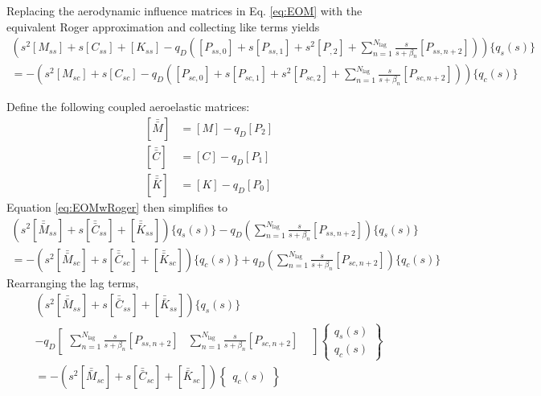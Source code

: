 Replacing the aerodynamic influence matrices in Eq. \ref{eq:EOM} with the equivalent Roger approximation and collecting like terms yields
\begin{multline}
	\label{eq:EOMwRoger}
	\left( s^2 [M_{ss}] + s [C_{ss}] + [K_{ss}]
	- q_D \left( [P_{ss,0}] + s[P_{ss,1}] + s^2 [P_{,2}] + \sum_{n=1}^{N_\text{lag}} \frac{s}{s+\beta_n} [P_{ss,n+2}] \right) \right) \{ q_s(s)\} \\
	=
	- \left( s^2 [M_{sc}] + s [C_{sc}] - q_D \left( [P_{sc,0}] + s [P_{sc,1}] + s^2 [P_{sc,2}] + \sum_{n=1}^{N_\text{lag}} \frac{s}{s+\beta_n} [P_{sc,n+2}] \right) \right) \{q_c(s)\}
\end{multline}

Define the following coupled aeroelastic matrices:
\begin{equation}
\begin{aligned}
	\left[\bar{\bar{M}}\right] &= [M] - q_D [P_2] \\
	\left[\bar{\bar{C}}\right] &= [C] - q_D [P_1] \\
	\left[\bar{\bar{K}}\right] &= [K] - q_D [P_0]
\end{aligned}
\end{equation}
Equation \ref{eq:EOMwRoger} then simplifies to
\begin{multline}
	\left( s^2 \left[\bar{\bar{M}}_{ss}\right] + s \left[\bar{\bar{C}}_{ss}\right] + \left[\bar{\bar{K}}_{ss}\right] \right) \{ q_s(s)\}
	- q_D \left(\sum_{n=1}^{N_\text{lag}} \frac{s}{s+\beta_n} [P_{ss,n+2}] \right) \{ q_s(s)\} \\
	=
	- \left( s^2 \left[\bar{\bar{M}}_{sc}\right] + s \left[\bar{\bar{C}}_{sc}\right] + \left[\bar{\bar{K}}_{sc}\right] \right) \{q_c(s)\} + q_D \left(\sum_{n=1}^{N_\text{lag}} \frac{s}{s+\beta_n} [P_{sc,n+2}] \right) \{q_c(s)\}
\end{multline}
Rearranging the lag terms,
\begin{multline}
	\label{eq:EOMcoupled}
	\left( s^2 \left[\bar{\bar{M}}_{ss}\right] + s \left[\bar{\bar{C}}_{ss}\right] + \left[\bar{\bar{K}}_{ss}\right] \right) \{ q_s(s)\}
	\\
	- q_D \begin{bmatrix}
		\sum_{n=1}^{N_\text{lag}} \frac{s}{s+\beta_n} [P_{ss,n+2}] &
		\sum_{n=1}^{N_\text{lag}} \frac{s}{s+\beta_n} [P_{sc,n+2}] &
	\end{bmatrix} \begin{Bmatrix} q_s(s) \\ q_c(s) \end{Bmatrix}
	\\
	= - \left( s^2 \left[\bar{\bar{M}}_{sc}\right] + s \left[\bar{\bar{C}}_{sc}\right] + \left[ \bar{\bar{K}}_{sc} \right] \right) \begin{Bmatrix} q_c(s) \end{Bmatrix}
\end{multline}

